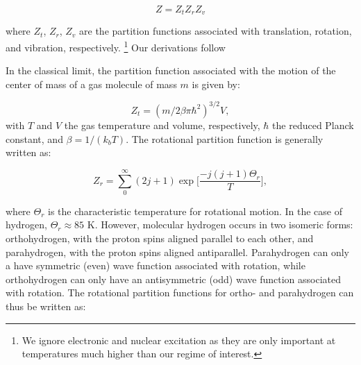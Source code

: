 \documentclass[apj]{emulateapj}
\begin{document}

\begin{equation}
\label{eq:zagain}
Z=Z_t Z_r Z_v
\end{equation} 

\noindent where $Z_t$, $Z_r$, $Z_v$ are the partition functions associated with translation, rotation, and vibration, respectively. \footnote{We ignore electronic and nuclear excitation as they are only important at temperatures much higher than our regime of interest.} Our derivations follow \citet{kittel} %


In the classical limit, the partition function associated with the motion of the center of mass of a gas molecule of mass $m$ is given by:

\begin{equation}
\label{eq:Zt}
Z_t=(m/2 \beta \pi \hbar^2)^{3/2} V,
\end{equation}
with  $T$ and $V$ the gas temperature and volume, respectively, $\hbar$ the reduced Planck constant, and  $\beta=1/(k_b T)$. The rotational partition function is generally written as:

\begin{equation}
\label{eq:Zr}
Z_r=\sum_0^\infty (2 j+1) \exp{\Big[\frac{-j (j+1)\Theta_r}{T}\Big]},
\end{equation}

\noindent where $\Theta_r$ is the characteristic temperature for rotational motion. In the case of hydrogen, $\Theta_r \approx 85$ K. However, molecular hydrogen occurs in two isomeric forms: orthohydrogen, with the proton spins aligned parallel to each other, and parahydrogen, with the proton spins aligned antiparallel. Parahydrogen can only a have symmetric (even) wave function associated with rotation, while orthohydrogen can only have an antisymmetric (odd) wave function associated with rotation. The rotational partition functions for ortho- and parahydrogen can thus be written as:
\end{document}
